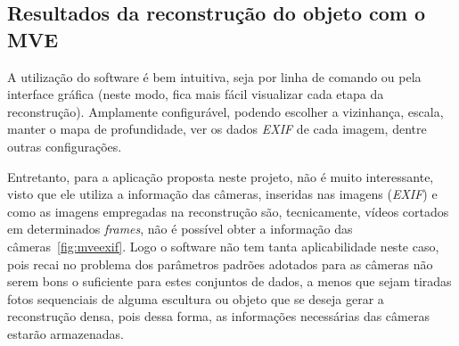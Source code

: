 \begin{figure}[!h]
	\centering
	\caption{%
	}
\end{figure}


\subsection{Resultados da reconstrução do objeto com o MVE}

A utilização do software é bem intuitiva, seja por linha de comando ou pela interface gráfica (neste modo, fica mais fácil visualizar cada etapa da reconstrução). Amplamente configurável, podendo escolher a vizinhança, escala, manter o mapa de profundidade, ver os dados \emph{EXIF} de cada imagem, dentre outras configurações.

Entretanto, para a aplicação proposta neste projeto, não é muito interessante, visto que ele utiliza a informação das câmeras, inseridas nas imagens (\emph{EXIF}) e como as imagens empregadas na reconstrução são, tecnicamente, vídeos cortados em determinados \emph{frames}, não é possível obter a informação das câmeras~\ref{fig:mveexif}. Logo o software não tem tanta aplicabilidade neste caso, pois recai no problema dos parâmetros padrões adotados para as câmeras não serem bons o suficiente para estes conjuntos de dados, a menos que sejam tiradas fotos sequenciais de alguma escultura ou objeto que se deseja gerar a reconstrução densa, pois dessa forma, as informações necessárias das câmeras estarão armazenadas.

